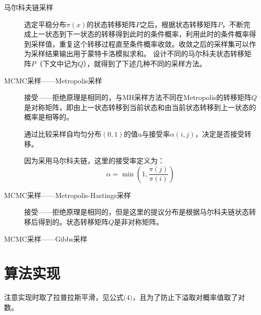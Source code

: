 \documentclass{ctexart}
\begin{document}
\begin{description}
\item[马尔科夫链采样]
选定平稳分布$\pi \left(x\right)$的状态转移矩阵$P$之后，根据状态转移矩阵$P$，不断完成上一状态到下一状态的转移得到此时的条件概率，利用此时的条件概率得到采样值，重复这个转移过程直至条件概率收敛。收敛之后的采样集可以作为采样结果输出用于蒙特卡洛模拟求和。
设计不同的马尔科夫状态转移矩阵$P$（下文中记为$Q$），就得到了下述几种不同的采样方法。

\item[MCMC采样——Metropolis采样]
接受——拒绝原理是相同的，与MH采样方法不同在Metropolis的转移矩阵$Q$是对称矩阵，即由上一状态转移到当前状态和由当前状态转移到上一状态的概率是相等的。

通过比较采样自均匀分布$\left(0,1\right)$的值u与接受率$\alpha\left(i,j\right)$，决定是否接受转移。

因为采用马尔科夫链，这里的接受率定义为：
\begin{equation}
\alpha = \min\left(1,\frac{\pi\left(j\right)}{\pi\left(i\right)}\right)
\end{equation}

\item[MCMC采样——Metropolis-Hastings采样]
接受——拒绝原理是相同的，但是这里的提议分布是根据马尔科夫链状态转移后得到的。状态转移矩阵$Q$是非对称矩阵。



\item[MCMC采样——Gibbs采样]



\end{description}





\section{算法实现}
%
%
注意实现时取了拉普拉斯平滑，见公式$\big(4\big)$，且为了防止下溢取对概率值取了对数。\cite{mcmc:Liu}
%
\end{document}
